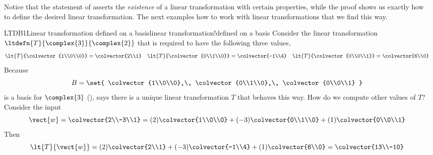 %
Notice that the statement of  asserts the {\em existence} of a linear transformation with certain properties, while the proof shows us exactly how to define the desired linear transformation.  The next examples how to work with linear transformations that we find this way.
%
\begin{example}{LTDB1}{Linear transformation defined on a basis}{linear transformation!defined on a basis}
Consider the linear transformation $\ltdefn{T}{\complex{3}}{\complex{2}}$ that is required to have the following three values,
%
\begin{align*}
\lt{T}{\colvector{1\\0\\0}}=\colvector{2\\1}&&
\lt{T}{\colvector{0\\1\\0}}=\colvector{-1\\4}&&
\lt{T}{\colvector{0\\0\\1}}=\colvector{6\\0}
\end{align*}
%
Because
%
\begin{equation*}
B=\set{
\colvector{1\\0\\0},\,
\colvector{0\\1\\0},\,
\colvector{0\\0\\1}
}
\end{equation*}
%
is a basis for $\complex{3}$ (),  says there is a unique linear transformation $T$ that behaves this way.  How do we compute other values of $T$?  Consider the input
%
\begin{equation*}
\vect{w}=\colvector{2\\-3\\1}=(2)\colvector{1\\0\\0}+(-3)\colvector{0\\1\\0}+(1)\colvector{0\\0\\1}
\end{equation*}
%
Then
%
\begin{equation*}
\lt{T}{\vect{w}}=(2)\colvector{2\\1}+ (-3)\colvector{-1\\4}+ (1)\colvector{6\\0}=\colvector{13\\-10}

\end{equation*}
\end{example}
